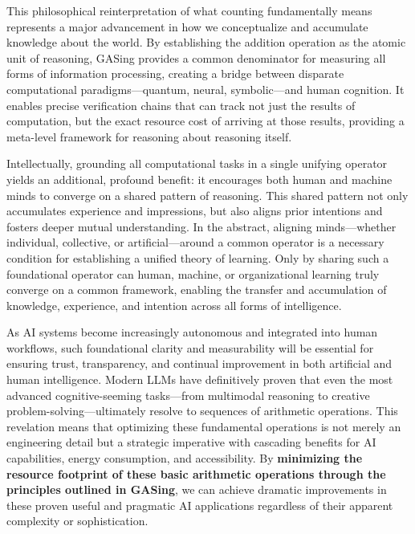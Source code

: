 This philosophical reinterpretation of what counting fundamentally means represents a major advancement in how we conceptualize and accumulate knowledge about the world. By establishing the addition operation as the atomic unit of reasoning, GASing provides a common denominator for measuring all forms of information processing, creating a bridge between disparate computational paradigms—quantum, neural, symbolic—and human cognition. It enables precise verification chains that can track not just the results of computation, but the exact resource cost of arriving at those results, providing a meta-level framework for reasoning about reasoning itself.

Intellectually, grounding all computational tasks in a single unifying operator yields an additional, profound benefit: it encourages both human and machine minds to converge on a shared pattern of reasoning. This shared pattern not only accumulates experience and impressions, but also aligns prior intentions and fosters deeper mutual understanding. In the abstract, aligning minds—whether individual, collective, or artificial—around a common operator is a necessary condition for establishing a unified theory of learning. Only by sharing such a foundational operator can human, machine, or organizational learning truly converge on a common framework, enabling the transfer and accumulation of knowledge, experience, and intention across all forms of intelligence.

As AI systems become increasingly autonomous and integrated into human workflows, such foundational clarity and measurability will be essential for ensuring trust, transparency, and continual improvement in both artificial and human intelligence. Modern LLMs have definitively proven that even the most advanced cognitive-seeming tasks—from multimodal reasoning to creative problem-solving—ultimately resolve to sequences of arithmetic operations. This revelation means that optimizing these fundamental operations is not merely an engineering detail but a strategic imperative with cascading benefits for AI capabilities, energy consumption, and accessibility. By \textbf{minimizing the resource footprint of these basic arithmetic operations through the principles outlined in GASing}, we can achieve dramatic improvements in these proven useful and pragmatic AI applications regardless of their apparent complexity or sophistication.

